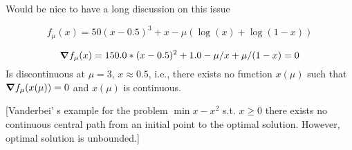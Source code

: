 \documentclass{article}
\begin{document}
Would be nice to have a long discussion on this issue

$$
f_{\mu}(x) = 50 (x - 0.5)^3 + x - \mu (\log(x) + \log(1 - x))
$$

$$
\grad f_{\mu}(x) = 150.0 * (x - 0.5)^2 + 1.0  - \mu / x + \mu / (1 - x) = 0 \\
$$
Is discontinuous at $\mu = 3$, $x \approx 0.5$, i.e., there exists no function $x(\mu)$ such that $\grad f_{\mu}(x(\mu)) = 0$ and $x(\mu)$ is continuous. 

[Vanderbei' s example for the problem $\min{ x -x^2}$ s.t. $x \ge 0$ there exists no continuous central path from an initial point to the optimal solution. However, optimal solution is unbounded.]
\end{document}
